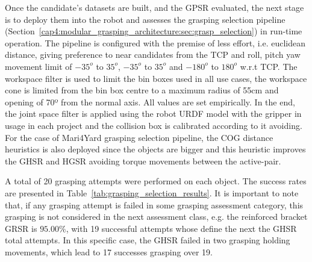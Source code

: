 Once the candidate's datasets are built, and the \ac{GPSR} evaluated, the next stage is to deploy them into the robot and assesses the grasping selection pipeline (Section~\ref{cap4:modular_grasping_architecture:sec:grasp_selection}) in run-time operation. The pipeline is configured with the premise of less effort, i.e. euclidean distance, giving preference to near candidates from the \ac{TCP} and roll, pitch yaw movement limit of $-35^o$ to $35^o$, $-35^o$ to $35^o$ and $-180^o$ to $180^o$ w.r.t \ac{TCP}. The workspace filter is used to limit the bin boxes used in all use cases, the workspace cone is limited from the bin box centre to a maximum radius of 55cm and opening of 70º from the normal axis. All values are set empirically. In the end, the joint space filter is applied using the robot URDF model with the gripper in usage in each project and the collision box is calibrated according to it avoiding. For the case of Mari4Yard grasping selection pipeline, the \ac{COG} distance heuristics is also deployed since the objects are bigger and this heuristic improves the \ac{GHSR} and \ac{HGSR} avoiding torque movements between the active-pair. 

A total of 20 grasping attempts were performed on each object. The success rates are presented in Table~\ref{tab:grasping_selection_results}. It is important to note that, if any grasping attempt is failed in some grasping assessment category, this grasping is not considered in the next assessment class, e.g. the reinforced bracket \ac{GRSR} is $95.00\%$, with 19 successful attempts whose define the next the \ac{GHSR} total attempts. In this specific case, the \ac{GHSR} failed in two grasping holding movements, which lead to 17 successes grasping over 19.

